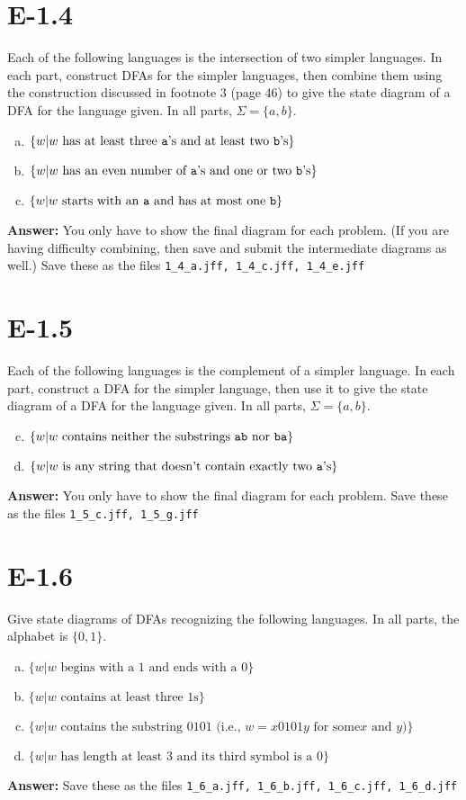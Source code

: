 \documentclass{article}
\begin{document}
\section*{E-1.4}
Each of the following languages is the intersection of two simpler languages.
In each part, construct DFAs for the simpler languages, then combine them using
the construction discussed in footnote 3 (page 46) to give the state diagram
of a DFA for the language given.
In all parts, $\Sigma = \{a, b\}$.
\begin{enumerate}[a.]
\item $\{ w | w \mbox{\ has at least three {\tt a}'s and at least two {\tt b}'s}\}$
\item $\{ w | w \mbox{\ has an even number of {\tt a}'s and one or two {\tt b}'s}\}$
\item $\{ w | w \mbox{\ starts with an {\tt a} and has at most one {\tt b}}\}$
\end{enumerate}

{\bf Answer: } You only have to show the final diagram for each problem.
(If you are having difficulty combining, then save and submit the 
intermediate diagrams as well.)
Save these as the files \verb=1_4_a.jff, 1_4_c.jff, 1_4_e.jff=

\section*{E-1.5}
Each of the following languages is the complement of a simpler language.
In each part, construct a DFA for the simpler language, then use it to give the
state diagram of a DFA for the language given.
In all parts, $\Sigma = \{a, b\}$.
\begin{enumerate}[a.]
\setcounter{enumi}{2}
\item $\{w | w \mbox{\ contains neither the substrings {\tt ab} nor {\tt ba}}\}$
\setcounter{enumi}{6}
\item $\{w | w \mbox{\ is any string that doesn't contain exactly two {\tt a}'s}\}$
\end{enumerate}

{\bf Answer: } You only have to show the final diagram for each problem.
Save these as the files \verb=1_5_c.jff, 1_5_g.jff=

\section*{E-1.6}
Give state diagrams of DFAs recognizing the following languages.
In all parts, the alphabet is $\{0,1\}$.
\begin{enumerate}[a.]
\item $\{ w | w \mbox{\ begins with a 1 and ends with a 0}\}$
\item $\{ w | w \mbox{\ contains at least three 1s}\}$
\item $\{ w | w \mbox{\ contains the substring 0101 (i.e., $w = x0101y$ for some
$x$ and $y$)}\}$
\item $\{ w | w \mbox{\ has length at least 3 and its third symbol is a 0}\}$
\end{enumerate}

{\bf Answer: } Save these as the files \verb=1_6_a.jff, 1_6_b.jff, 1_6_c.jff, 1_6_d.jff=
\end{document}
